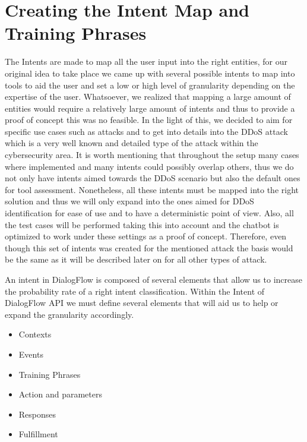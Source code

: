 \section{Creating the Intent Map and Training Phrases}
The Intents are made to map all the user input into the right entities, for our original idea to take place we came up with several possible intents to map into tools to aid the user and set a low or high level of granularity depending on the expertise of the user. Whatsoever, we realized that mapping a large amount of entities would require a relatively large amount of intents and thus to provide a proof of concept this was no feasible. In the light of this, we decided to aim for specific use cases such as attacks and to get into details into the DDoS attack which is a very well known and detailed type of the attack within the cybersecurity area. It is worth mentioning that throughout the setup many cases where implemented and many intents could possibly overlap others, thus we do not only have intents aimed towards the DDoS scenario but also the default ones for tool assessment. Nonetheless, all these intents must be mapped into the right solution and thus we will only expand into the ones aimed for DDoS identification for ease of use and to have a deterministic point of view. Also, all the test cases will be performed taking this into account and the chatbot is optimized to work under these settings as a proof of concept. Therefore, even though this set of intents was created for the mentioned attack the basis would be the same as it will be described later on for all other types of attack.

An intent in DialogFlow is composed of several elements that allow us to increase the probability rate of a right intent classification. Within the Intent of DialogFlow API we must define several elements that will aid us to help or expand the granularity accordingly.

\begin{itemize}
    \item Contexts
    \item Events
    \item Training Phrases
    \item Action and parameters
    \item Responses
    \item Fulfillment
\end{itemize}{}

